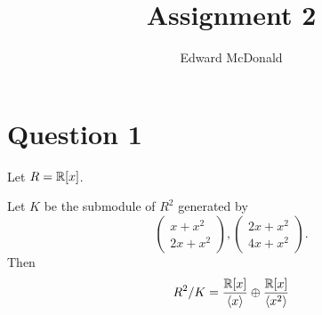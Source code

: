 \documentclass{unswmaths}
\begin{document}
\subject{Modules and Representation Theory}
\author{Edward McDonald}
\title{Assignment 2}


\setlength\parindent{0pt}

\newcommand{\Ft}{\mathbb{F}_3}
\newcommand{\isom}{\cong}

\unswtitle{}
    
\section*{Question 1}
Let $R = \mathbb{R}[x]$.
\begin{lemma}
    Let $K$ be the submodule of $R^2$ generated by
    \begin{equation*}
        \begin{pmatrix}x+x^2\\2x+x^2\end{pmatrix},\begin{pmatrix}2x+x^2\\4x+x^2\end{pmatrix}.
    \end{equation*} 
    Then
    \begin{equation*}
        R^2/K = \frac{\mathbb{R}[x]}{\langle x \rangle}\oplus\frac{\mathbb{R}[x]}{\langle x^2\rangle}
    \end{equation*}
\end{lemma}
\end{document}
